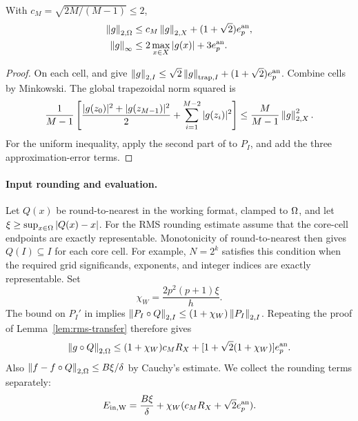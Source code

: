 \begin{lemma}
\label{lem:rms-transfer}
With $c_M=\sqrt{2M/(M-1)}\le2$,
\begin{align}
 \left\lVert g\right\rVert_{2,\Omega}&\le c_M\left\lVert g\right\rVert_{2,X}+(1+\sqrt2)e_p^{\rm an},
 \label{eq:rms-transfer}\\
 \left\lVert g\right\rVert_\infty&\le2\max_{x\in X}|g(x)|+3e_p^{\rm an}.
 \label{eq:uniform-transfer}
\end{align}
\end{lemma}
\begin{proof}
On each cell,  and  give
$\left\lVert g\right\rVert_{2,I}\le\sqrt2\left\lVert g\right\rVert_{\mathrm{trap},I}+(1+\sqrt2)e_p^{\rm an}$.
Combine cells by Minkowski. The global trapezoidal norm squared is
\[
 \frac1{M-1}\left[\frac{|g(z_0)|^2+|g(z_{M-1})|^2}2
                       +\sum_{i=1}^{M-2}|g(z_i)|^2\right]
 \le\frac M{M-1}\left\lVert g\right\rVert_{2,X}^2.
\]
For the uniform inequality, apply the second part of  to
$P_I$, and add the three approximation-error terms.
\end{proof}

\paragraph{Input rounding and evaluation.}
Let $Q(x)$ be round-to-nearest in the working format, clamped to $\Omega$, and
let $\xi\ge\sup_{x\in\Omega}|Q(x)-x|$. For the RMS rounding estimate assume
that the core-cell endpoints are exactly representable. Monotonicity of
round-to-nearest then gives $Q(I)\subseteq I$ for each core cell. For example, $N=2^k$ satisfies this condition when the required grid
significands, exponents, and integer indices are exactly representable.
Set
\begin{equation}
 \chi_W=\frac{2p^2(p+1)\xi}h.
 \label{eq:chi}
\end{equation}
The bound on $P_I'$ in  implies
$\left\lVert P_I\circ Q\right\rVert_{2,I}\le(1+\chi_W)\left\lVert P_I\right\rVert_{2,I}$.
Repeating the proof of Lemma~\ref{lem:rms-transfer} therefore gives
\begin{equation}
 \left\lVert g\circ Q\right\rVert_{2,\Omega}
 \le(1+\chi_W)c_M R_X+
       [1+\sqrt2(1+\chi_W)]e_p^{\rm an}.
 \label{eq:gQ}
\end{equation}
Also $\left\lVert f-f\circ Q\right\rVert_{2,\Omega}\le B\xi/\delta$ by Cauchy's estimate.
We collect the rounding terms separately:
\begin{equation}
 E_{\rm in,W}=\frac{B\xi}\delta+
        \chi_W(c_M R_X+\sqrt2 e_p^{\rm an}).
 \label{eq:input-round-target}
\end{equation}

